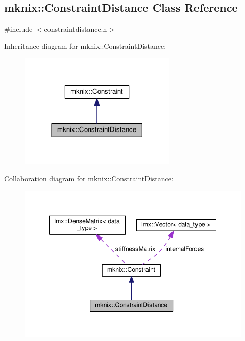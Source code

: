 \hypertarget{classmknix_1_1_constraint_distance}{}\subsection{mknix\+:\+:Constraint\+Distance Class Reference}
\label{classmknix_1_1_constraint_distance}


{\ttfamily \#include $<$constraintdistance.\+h$>$}



Inheritance diagram for mknix\+:\+:Constraint\+Distance\+:\nopagebreak
\begin{figure}[H]
\begin{center}
\leavevmode
\includegraphics[width=213pt]{dd/dfd/classmknix_1_1_constraint_distance__inherit__graph}
\end{center}
\end{figure}


Collaboration diagram for mknix\+:\+:Constraint\+Distance\+:\nopagebreak
\begin{figure}[H]
\begin{center}
\leavevmode
\includegraphics[width=348pt]{da/d3d/classmknix_1_1_constraint_distance__coll__graph}
\end{center}
\end{figure}
